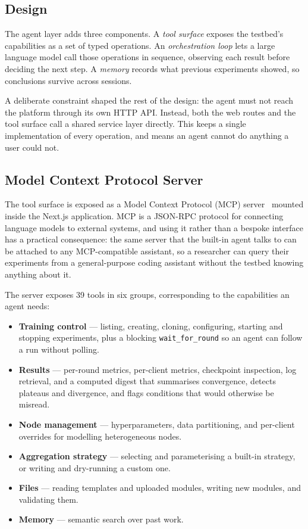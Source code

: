 \documentclass[conference]{IEEEtran}
\begin{document}
\subsection{Design}

The agent layer adds three components.
A \emph{tool surface} exposes the testbed's capabilities as a set of
typed operations.
An \emph{orchestration loop} lets a large language model call those
operations in sequence, observing each result before deciding the next
step.
A \emph{memory} records what previous experiments showed, so conclusions
survive across sessions.

A deliberate constraint shaped the rest of the design: the agent must not
reach the platform through its own HTTP API.
Instead, both the web routes and the tool surface call a shared service
layer directly.
This keeps a single implementation of every operation, and means an
agent cannot do anything a user could not.

\subsection{Model Context Protocol Server}

The tool surface is exposed as a Model Context Protocol (MCP)
server~\cite{mcp} mounted inside the Next.js application.
MCP is a JSON-RPC protocol for connecting language models to external
systems, and using it rather than a bespoke interface has a practical
consequence: the same server that the built-in agent talks to can be
attached to any MCP-compatible assistant, so a researcher can query their
experiments from a general-purpose coding assistant without the testbed
knowing anything about it.

The server exposes 39 tools in six groups, corresponding to the
capabilities an agent needs:

\begin{itemize}
  \item \textbf{Training control} --- listing, creating, cloning,
        configuring, starting and stopping experiments, plus a blocking
        \texttt{wait\_for\_round} so an agent can follow a run without
        polling.
  \item \textbf{Results} --- per-round metrics, per-client metrics,
        checkpoint inspection, log retrieval, and a computed digest that
        summarises convergence, detects plateaus and divergence, and
        flags conditions that would otherwise be misread.
  \item \textbf{Node management} --- hyperparameters, data partitioning,
        and per-client overrides for modelling heterogeneous nodes.
  \item \textbf{Aggregation strategy} --- selecting and parameterising a
        built-in strategy, or writing and dry-running a custom one.
  \item \textbf{Files} --- reading templates and uploaded modules,
        writing new modules, and validating them.
  \item \textbf{Memory} --- semantic search over past work.
\end{itemize}
\end{document}
